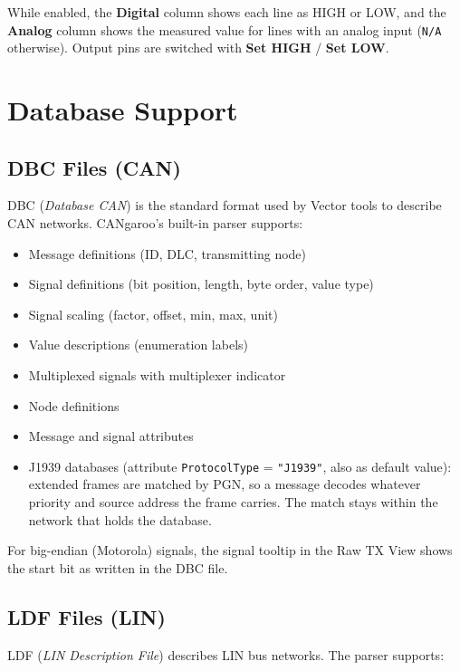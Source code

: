 \documentclass[a4paper,11pt]{article}
\newcommand{\ui}[1]{\textbf{#1}}
\begin{document}
While enabled, the \ui{Digital} column shows each line as HIGH or LOW, and the
\ui{Analog} column shows the measured value for lines with an analog input
(\texttt{N/A} otherwise). Output pins are switched with \ui{Set HIGH} /
\ui{Set LOW}.

\section{Database Support}

\subsection{DBC Files (CAN)}

DBC (\textit{Database CAN}) is the standard format used by Vector tools to describe
CAN networks. CANgaroo's built-in parser supports:

\begin{itemize}
  \item Message definitions (ID, DLC, transmitting node)
  \item Signal definitions (bit position, length, byte order, value type)
  \item Signal scaling (factor, offset, min, max, unit)
  \item Value descriptions (enumeration labels)
  \item Multiplexed signals with multiplexer indicator
  \item Node definitions
  \item Message and signal attributes
  \item J1939 databases (attribute \texttt{ProtocolType} = \texttt{"J1939"}, also as
        default value): extended frames are matched by PGN, so a message decodes
        whatever priority and source address the frame carries. The match stays
        within the network that holds the database.
\end{itemize}

For big-endian (Motorola) signals, the signal tooltip in the Raw TX View shows
the start bit as written in the DBC file.

\subsection{LDF Files (LIN)}

LDF (\textit{LIN Description File}) describes LIN bus networks. The parser supports:
\end{document}

